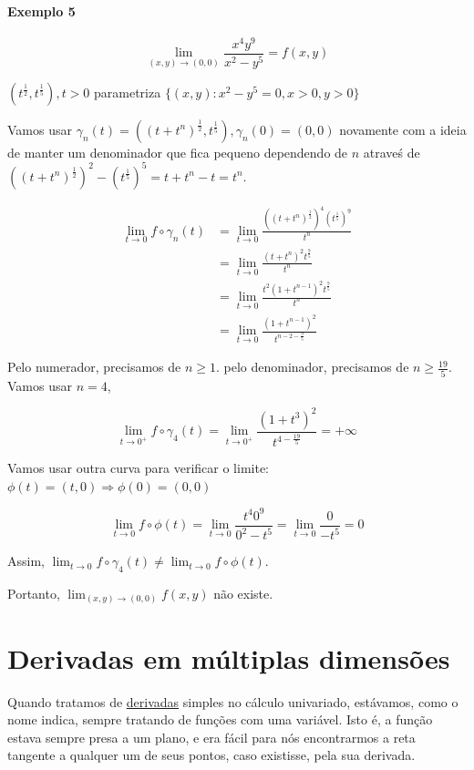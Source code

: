 \documentclass[
  portuguese,
  letterpaper,
  DIV=11,
  numbers=noendperiod]{scrreport}
\begin{document}
\subsubsection{Exemplo 5}\label{exemplo-5}

\[
\lim_{(x,y)\rightarrow(0,0)} \frac{x^4 y^9}{x^2-y^5} = f(x,y)
\]

\((t^\frac{1}{2}, t^{\frac{1}{5}}), t > 0\) parametriza
\(\{(x,y):x^2-y^5=0, x>0, y>0\}\)

Vamos usar
\(\gamma_n(t) = \left((t+t^n)^{\frac{1}{2}}, t^{\frac{1}{5}}\right), \gamma_n(0) = (0,0)\)
novamente com a ideia de manter um denominador que fica pequeno
dependendo de \(n\) atraveś de
\(((t+t^n)^{\frac{1}{2}})^2 - (t^{\frac{1}{5}})^5 = t+t^n -t = t^n\).

\[
\begin{aligned}
\lim_{t\rightarrow 0} f \circ \gamma_n(t) &= \lim_{t\rightarrow 0}
\frac{\left((t+t^n)^{\frac{1}{2}}\right)^4 (t^\frac{1}{5})^9}{t^n} \\
& = \lim_{t\rightarrow 0} \frac{(t+t^n)^2 t^{\frac{9}{5}}}{t^n} \\
& = \lim_{t\rightarrow 0} \frac{t^2 (1+t^{n-1})^2 t^{\frac{9}{5}}}{t^n} \\
& = \lim_{t\rightarrow 0} \frac{(1+t^{n-1})^2}{t^{n-2-\frac{9}{5}}}
\end{aligned}
\]

Pelo numerador, precisamos de \(n \geq 1\). pelo denominador, precisamos
de \(n \geq \frac{19}{5}\). Vamos usar \(n = 4\),

\[
\lim_{t\rightarrow 0^{+}} f \circ \gamma_4(t) = \lim_{t\rightarrow 0^{+}}
\frac{(1+t^3)^2}{t^{4-\frac{19}{5}}} = +\infty
\]

Vamos usar outra curva para verificar o limite:
\(\phi(t) = (t,0) \Rightarrow \phi(0) = (0,0)\)

\[
\lim_{t\rightarrow 0} f \circ \phi (t) = \lim_{t \rightarrow 0} \frac{t^4 0^9}{0^2 -t^5} 
= \lim_{t\rightarrow 0} \frac{0}{-t^5} = 0
\]

Assim,
\(\lim_{t\rightarrow 0} f \circ \gamma_4(t) \neq \lim_{t\rightarrow 0} f \circ \phi (t)\).

Portanto, \(\lim_{(x,y) \rightarrow (0,0)} f(x,y)\) não existe.

\chapter{Derivadas em múltiplas
dimensões}\label{derivadas-em-muxfaltiplas-dimensuxf5es}

Quando tratamos de \href{d-simples.qmd}{derivadas} simples no cálculo
univariado, estávamos, como o nome indica, sempre tratando de funções
com uma variável. Isto é, a função estava sempre presa a um plano, e era
fácil para nós encontrarmos a reta tangente a qualquer um de seus
pontos, caso existisse, pela sua derivada.
\end{document}
